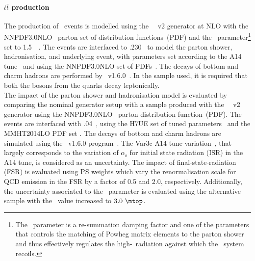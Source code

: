 \paragraph{$t\bar{t}$ production} 
The production of \ttbar\ events is modelled using the
\powhegbox~\cite{Frixione:2007nw,Nason:2004rx,Frixione:2007vw,Alioli:2010xd}~v2
generator at NLO with the \textsc{NNPDF3.0NLO}~\cite{Ball:2014uwa} parton set
of distribution functions~(PDF) and the \hdamp\ parameter\footnote{The
	\hdamp\ parameter is a re-summation damping factor and one of the
	parameters that controls the matching of Powheg matrix elements to
	the parton shower and thus effectively regulates the
	high-\pt\ radiation against which the \ttbar\ system recoils.} set
to 1.5~\mtop~\cite{ATL-PHYS-PUB-2016-020}.  The events are interfaced
to \pythia.230~\cite{Sjostrand:2014zea} to model the parton shower,
hadronisation, and underlying event, with parameters set according
to the A14 tune~\cite{ATL-PHYS-PUB-2014-021} and using the \textsc{NNPDF3.0NLO}
set of PDFs~\cite{Ball:2012cx}. The decays of bottom and charm hadrons
are performed by \mbox{\evtgen~v1.6.0~\cite{EvtGen}.}
In the sample used, it is required that both the \PW bosons from the \Pqt quarks decay leptonically.\\
The impact of the parton shower and hadronisation model is evaluated
by comparing the nominal generator setup with a sample produced with
the
\powhegbox~\cite{Frixione:2007nw,Nason:2004rx,Frixione:2007vw,Alioli:2010xd}~v2
generator using the \textsc{NNPDF3.0NLO}~\cite{Ball:2014uwa} parton
distribution function~(PDF). The events are interfaced with
\herwigseven.04~\cite{Bahr:2008pv,Bellm:2015jjp}, using the H7UE set
of tuned parameters~\cite{Bellm:2015jjp} and the MMHT2014LO PDF set
\cite{Harland-Lang:2014zoa}.
The decays of bottom and charm hadrons
are simulated using the \evtgen\ v1.6.0 program~\cite{EvtGen}. 
The Var3c A14 tune variation~\cite{ATL-PHYS-PUB-2014-021}, that largely corresponds to the variation of
$\alpha_{\textrm{s}}$ for initial state radiation (ISR) in the A14
tune, is considered as an uncertainty. The impact of final-state-radiation (FSR) is evaluated using PS
weights which vary the renormalisation scale for QCD emission in the
FSR by a factor of 0.5 and 2.0, respectively.
Additionally, the uncertainty associated to the \hdamp\ parameter is evaluated using the
alternative sample with the \hdamp\ value increased to $3.0~\mtop$. 


